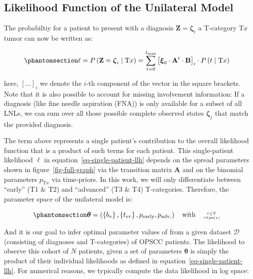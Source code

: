 \documentclass[
  sn-mathphys-num,
]{sn-jnl}
\begin{document}
\subsection{Likelihood Function of the Unilateral
Model}\label{likelihood-function-of-the-unilateral-model}

The probabiltiy for a patient to present with a diagnosis
\(\mathbf{Z} = \boldsymbol{\zeta}_i\) a T-category \(\text{T}x\) tumor
can now be written as:

\begin{equation}\phantomsection\label{eq-single-patient-llh}{
\ell = P \left( \mathbf{Z} = \boldsymbol{\zeta}_i \mid \text{T}x \right) = \sum_{t=0}^{t_\text{max}} \left[ \boldsymbol{\xi}_0 \cdot \mathbf{A}^t \cdot \mathbf{B} \right]_i \cdot P \left( t \mid \text{T}x \right)
}\end{equation}

here, \(\left[ \ldots \right]_i\) we denote the \(i\)-th component of
the vector in the square brackets. Note that it is also possible to
account for missing involvement information: If a diagnosis (like fine
needle aspiration (FNA)) is only available for a subset of all LNLs, we
can sum over all those possible complete observed states
\(\boldsymbol{\zeta}_j\) that match the provided diagnosis.

The term above represents a single patient's contribution to the overall
likelihood function that is a product of such terms for each patient.
This single-patient likelihood \(\ell\) in
equation~\ref{eq-single-patient-llh} depends on the spread parameters
shown in figure~\ref{fig-full-graph} via the transition matrix
\(\mathbf{A}\) and on the binomial parameters \(p_{\text{T}x}\) via
time-priors. In this work, we will only differentiate between ``early''
(T1 \& T2) and ``advanced'' (T3 \& T4) T-categories. Therefore, the
parameter space of the unilateral model is:

\begin{equation}\phantomsection\label{eq-param-space}{
\boldsymbol{\theta} = \left( \left\{ b_v \right\}, \left\{ t_{vr} \right\}, p_\text{early}, p_\text{adv.} \right) \quad \text{with} \quad \genfrac{}{}{0pt}{2}{v\leq V}{r\in\operatorname{pa}(v)}
}\end{equation}

And it is our goal to infer optimal parameter values of from a given
dataset \(\mathcal{D}\) (consisting of diagnoses and T-categories) of
OPSCC patients. The likelihood to observe this cohort of \(N\) patients,
given a set of parameters \(\boldsymbol{\theta}\) is simply the product
of their individual likelihoods as defined in
equation~\ref{eq-single-patient-llh}. For numerical reasons, we
typically compute the data likelihood in log space:
\end{document}
